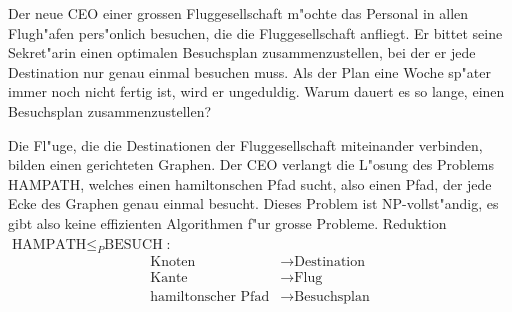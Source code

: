 Der neue CEO einer grossen Fluggesellschaft m"ochte das Personal in allen
Flugh"afen pers"onlich besuchen, die die Fluggesellschaft anfliegt.
Er bittet seine Sekret"arin einen optimalen Besuchsplan zusammenzustellen,
bei der er jede Destination nur genau einmal besuchen muss.
Als der Plan eine Woche sp"ater immer noch nicht fertig ist, wird er
ungeduldig.
Warum dauert es so lange, einen Besuchsplan zusammenzustellen?

\begin{loesung}
Die Fl"uge, die die Destinationen der Fluggesellschaft miteinander
verbinden, bilden einen gerichteten Graphen.
Der CEO verlangt die L"osung des Problems HAMPATH, welches einen
hamiltonschen Pfad sucht, also einen Pfad, der jede Ecke des Graphen
genau einmal besucht.
Dieses Problem ist NP-vollst"andig, es gibt also keine effizienten
Algorithmen f"ur grosse Probleme.
Reduktion $\text{HAMPATH}\le_P\text{BESUCH}$:
\begin{align*}
\text{Knoten}    & \to \text{Destination}\\
\text{Kante}     & \to \text{Flug} \\
\text{hamiltonscher Pfad}&\to\text{Besuchsplan}
\end{align*}
\end{loesung}

